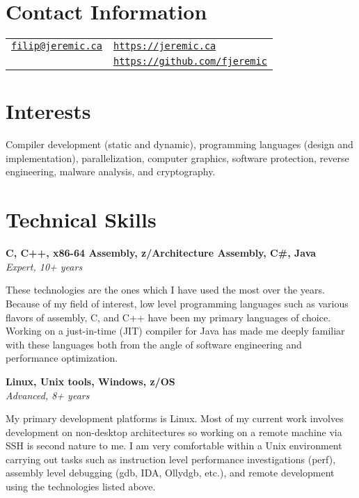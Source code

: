 \documentclass[margin,line]{res}
\begin{document}

\begin{resume}
\section{\sc Contact Information}

\vspace{.05in}

\begin{tabular}{@{}p{3.36in}p{3in}}
\href{mailto:filip@jeremic.ca}{\texttt{filip@jeremic.ca}} & \href{https://jeremic.ca}{\texttt{https://jeremic.ca}} \\
& \href{https://github.com/fjeremic}{\texttt{https://github.com/fjeremic}}
\end{tabular}

\section{\sc Interests}

Compiler development (static and dynamic), programming languages (design and implementation), parallelization, computer
graphics, software protection, reverse engineering, malware analysis, and cryptography.

\section{\sc Technical \newline Skills}

{\bf C, C++, x86-64 Assembly, z/Architecture Assembly, C\#, Java} \\
{\em Expert, 10+ years}

These technologies are the ones which I have used the most over the years. Because of my field of interest, low level
programming languages such as various flavors of assembly, C, and C++ have been my primary languages of choice.
Working on a just-in-time (JIT) compiler for Java has made me deeply familiar with these languages both
from the angle of software engineering and performance optimization.

{\bf Linux, Unix tools, Windows, z/OS } \\
{\em Advanced, 8+ years}

My primary development platforms is Linux. Most of my current work involves development on non-desktop
architectures so working on a remote machine via SSH is second nature to me. I am very comfortable within a Unix
environment carrying out tasks such as instruction level performance investigations (perf), assembly level debugging 
(gdb, IDA, Ollydgb, etc.), and remote development using the technologies listed above.


\end{resume}
\end{document}
